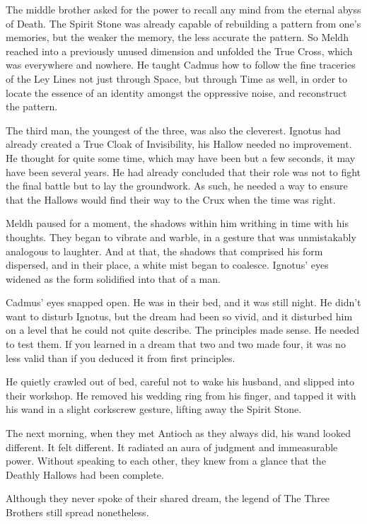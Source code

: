 The middle brother asked for the power to recall any mind from the eternal abyss of Death. The Spirit Stone was already capable of rebuilding a pattern from one’s memories, but the weaker the memory, the less accurate the pattern. So Meldh reached into a previously unused dimension and unfolded the True Cross, which was everywhere and nowhere. He taught Cadmus how to follow the fine traceries of the Ley Lines not just through Space, but through Time as well, in order to locate the essence of an identity amongst the oppressive noise, and reconstruct the pattern.

The third man, the youngest of the three, was also the cleverest. Ignotus had already created a True Cloak of Invisibility, his Hallow needed no improvement. He thought for quite some time, which may have been but a few seconds, it may have been several years. He had already concluded that their role was not to fight the final battle but to lay the groundwork. As such, he needed a way to ensure that the Hallows would find their way to the Crux when the time was right.

Meldh paused for a moment, the shadows within him writhing in time with his thoughts. They began to vibrate and warble, in a gesture that was unmistakably analogous to laughter. And at that, the shadows that comprised his form dispersed, and in their place, a white mist began to coalesce. Ignotus’ eyes widened as the form solidified into that of a man.
\simpleline

Cadmus’ eyes snapped open. He was in their bed, and it was still night. He didn’t want to disturb Ignotus, but the dream had been so vivid, and it disturbed him on a level that he could not quite describe. The principles made sense. He needed to test them. If you learned in a dream that two and two made four, it was no less valid than if you deduced it from first principles.

He quietly crawled out of bed, careful not to wake his husband, and slipped into their workshop. He removed his wedding ring from his finger, and tapped it with his wand in a slight corkscrew gesture, lifting away the Spirit Stone.

The next morning, when they met Antioch as they always did, his wand looked different. It felt different. It radiated an aura of judgment and immeasurable power. Without speaking to each other, they knew from a glance that the Deathly Hallows had been complete.

Although they never spoke of their shared dream, the legend of The Three Brothers still spread nonetheless.

